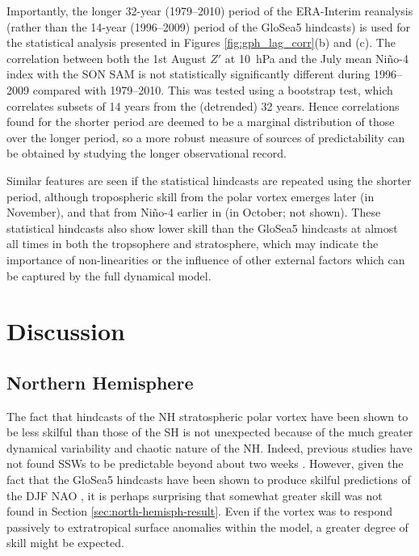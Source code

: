 Importantly, the longer 32-year (1979--2010) period of the ERA-Interim
reanalysis (rather than the 14-year (1996--2009) period of the GloSea5
hindcasts) is used for the statistical analysis presented in Figures
\ref{fig:gph_lag_corr}(b) and (c). The correlation between both the 1st August
$Z'$ at 10~hPa and the July mean Ni\~no-4 index with the SON SAM is not
statistically significantly different during 1996--2009 compared with
1979--2010. This was tested using a bootstrap test, which correlates subsets of
14 years from the (detrended) 32 years. Hence correlations found for the shorter
period are deemed to be a marginal distribution of those over the longer period,
so a more robust measure of sources of predictability can be obtained by
studying the longer observational record.

Similar features are seen if the statistical hindcasts are repeated using the
shorter period, although tropospheric skill from the polar vortex emerges later
(in November), and that from Ni\~no-4 earlier in (in October; not shown). These
statistical hindcasts also show lower skill than the GloSea5 hindcasts at almost
all times in both the tropsophere and stratosphere, which may indicate the
importance of non-linearities or the influence of other external factors which
can be captured by the full dynamical model.

\section{Discussion}
\label{sec:seas-discussion}
\subsection{Northern Hemisphere}

The fact that hindcasts of the NH stratospheric polar vortex have been shown to
be less skilful than those of the SH is not unexpected because of the much
greater dynamical variability and chaotic nature of the NH. Indeed, previous
studies have not found SSWs to be predictable beyond about two weeks
\citep{Marshall2010,Taguchi2014}. However, given the fact that the GloSea5
hindcasts have been shown to produce skilful predictions of the DJF NAO
\citep{Scaife2013}, it is perhaps surprising that somewhat greater skill was not
found in Section \ref{sec:north-hemisph-result}. Even if the vortex was to
respond passively to extratropical surface anomalies within the model, a greater
degree of skill might be expected.

